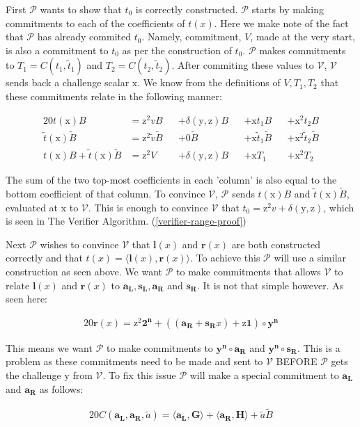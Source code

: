 \documentclass{article}
\newcommand{\eq}[1]{\begin{alignat*}{20}#1\end{alignat*}}
\renewcommand{\vec}[1]{\boldsymbol{#1}}
\newcommand{\ran}[1]{\mathrm{#1}}
\newcommand{\vecran}[1]{\mathbf{#1}}
\newcommand{\V}{\mathcal{V}}
\renewcommand{\P}{\mathcal{P}}
\newcommand{\tB}{\widetilde{B}}
\renewcommand{\tt}{\widetilde{t}}
\newcommand{\tv}{\widetilde{v}}
\newcommand{\dotp}[2]{\langle #1, #2 \rangle}
\newcommand{\opn}[1]{\operatorname{#1}}
\newcommand{\vecl}[1]{\vec{#1_{\opn{L}}}}
\newcommand{\vecr}[1]{\vec{#1_{\opn{R}}}}
\begin{document}
First $\P$ wants to show that $t_0$ is correctly constructed. $\P$
starts by making commitments to each of the coefficients of $t(x)$. Here
we make note of the fact that $\P$ has already commited $t_0$. Namely,
commitment, $V$, made at the very start, is also a commitment to $t_0$
as per the construction of $t_0$. $\P$ makes commitments to $T_1 =
C(t_1, \tt_1)$ and $T_2 = C(t_2, \tt_2)$. After commiting these values
to $\V$, $\V$ sends back a challenge scalar $\ran{x}$. We know from
the definitions of $V, T_1, T_2$ that these commitments relate in the
following manner:

\eq{
	t(\ran{x})B                   &= \ran{z^2}vB      &&+ \delta(\ran{y},\ran{z})B &&+ \ran{x}t_1B       &&+ \ran{x^2}t_2B \\
	\tt(\ran{x})\tB               &= \ran{z^2}\tv \tB &&+ 0\tB                     &&+ \ran{x} \tt_1 \tB &&+ \ran{x^2} \tt_2 \tB\\
	t(\ran{x})B + \tt(\ran{x})\tB &= \ran{z^2}V       &&+ \delta(\ran{y},\ran{z})B &&+ \ran{x}T_1        &&+ \ran{x^2}T_2
}

The sum of the two top-most coefficients in each 'column' is also
equal to the bottom coefficient of that column. To convince $\V$, $\P$
sends $t(\ran{x})B$ and $\tt(\ran{x})\tB$, evaluated at $\ran{x}$
to $\V$. This is enough to convince $\V$ that $t_0 = \ran{z^2}v +
\delta(\ran{y},\ran{z})$, which is seen in The Verifier Algorithm.
(\ref{verifier-range-proof})

Next $\P$ wishes to convince $\V$ that $\vec{l}(x)$ and
$\vec{r}(x)$ are both constructed correctly and that $t(x) =
\dotp{\vec{l}(x)}{\vec{r}(x)}$. To achieve this $\P$ will use a similar
construction as seen above. We want $\P$ to make commitments that allows
$\V$ to relate $\vec{l}(x)$ and $\vec{r}(x)$ to $\vecl{a}, \vecl{s},
\vecr{a}$ and $\vecr{s}$. It is not that simple however. As seen here:

\eq{
	\vec{r}(x) = \ran{z^2}\vec{2^n} + ((\vecr{a} + \vecr{s}x) + \ran{z}\vec{1})\circ\vecran{y^n}
}

This means we want $\P$ to make commitments to $\vec{y^n}\circ \vecr{a}$ and $\vec{y^n}\circ\vecr{s}$. This is a problem as these commitments need to be made and sent to $\V$ BEFORE $\P$ gets the challenge $\ran{y}$ from $\V$. To fix this issue $\P$ will make a special commitment to $\vecl{a}$ and $\vecr{a}$ as follows:

\eq{
	C(\vecl{a}, \vecr{a}, \widetilde{a}) = \dotp{\vecl{a}}{\vec{G}} + \dotp{\vecr{a}}{\vec{H}} + \widetilde{a}\tB
}
\end{document}

